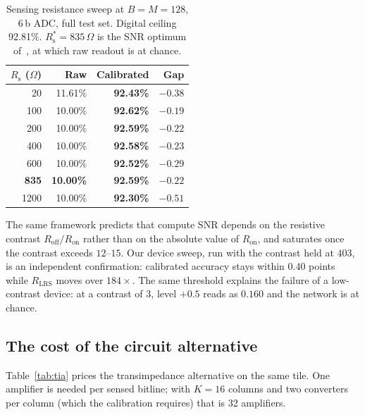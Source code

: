 \documentclass[conference,10pt]{IEEEtran}
\newcommand{\Rs}{R_{\mathrm{s}}}
\begin{document}
\begin{table}[t]
\centering
\caption{Sensing resistance sweep at $B{=}M{=}128$, 6\,b ADC, full test set.
Digital ceiling 92.81\%. $\Rs^{*}{=}835\,\Omega$ is the SNR optimum
of~\cite{shanbhag}, at which raw readout is at chance.}
\label{tab:rsense}
\begin{tabular}{rrrr}
\toprule
$\Rs$ ($\Omega$) & Raw & \textbf{Calibrated} & Gap \\
\midrule
20   & 11.61\% & \textbf{92.43\%} & $-0.38$ \\
100  & 10.00\% & \textbf{92.62\%} & $\mathbf{-0.19}$ \\
200  & 10.00\% & \textbf{92.59\%} & $-0.22$ \\
400  & 10.00\% & \textbf{92.58\%} & $-0.23$ \\
600  & 10.00\% & \textbf{92.52\%} & $-0.29$ \\
\textbf{835} & \textbf{10.00\%} & \textbf{92.59\%} & $\mathbf{-0.22}$ \\
1200 & 10.00\% & \textbf{92.30\%} & $-0.51$ \\
\bottomrule
\end{tabular}
\end{table}

The same framework predicts that compute SNR depends on the resistive contrast
$R_{\mathrm{off}}/R_{\mathrm{on}}$ rather than on the absolute value of
$R_{\mathrm{on}}$, and saturates once the contrast exceeds $12$--$15$. Our
device sweep, run with the contrast held at $403$, is an independent
confirmation: calibrated accuracy stays within $0.40$ points while
$R_{\mathrm{LRS}}$ moves over $184\times$. The same threshold explains the
failure of a low-contrast device: at a contrast of $3$, level $+0.5$ reads as
$0.160$ and the network is at chance.

\subsection{The cost of the circuit alternative}

Table~\ref{tab:tia} prices the transimpedance alternative on the same tile.
One amplifier is needed per sensed bitline; with $K{=}16$ columns and two
converters per column (which the calibration requires) that is 32 amplifiers.
\end{document}
